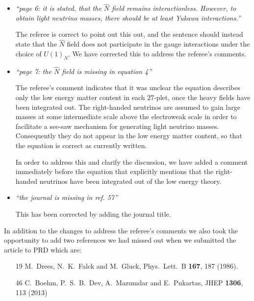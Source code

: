 \documentclass[12pt]{article}
\begin{document}
\begin{itemize}
\item {\it ``page 6: it is stated, that the $\hat N$ field remains
interactionless. However, to obtain light neutrino masses, there should be
at least Yukawa interactions.''}

The referee is correct to point out this out, and the sentence should instead
state that the $\hat N$ field does not participate in the gauge interactions
under the choice of $U(1)_N$. We have corrected this to address the referee's
comments.

\item {\it ``page 7: the $\hat N$ field is missing in equation 4''}

The referee's comment indicates that it was unclear the equation describes
only the low energy matter content in each $27$-plet, once the heavy fields
have been integrated out. The right-handed neutrinos are assumed to gain
large masses at some intermediate scale above the electroweak scale in order
to facilitate a see-saw mechanism for generating light neutrino masses.
Consequently they do not appear in the low energy matter content, so that
the equation is correct as currently written.

In order to address this and clarify the discussion, we have added a comment
immediately before the equation that explicitly mentions that the right-handed
neutrinos have been integrated out of the low energy theory.

\item {\it ``the journal is missing in ref. 57''}

This has been corrected by adding the journal title.


\end{itemize}

In addition to the changes to address the referee's comments we also took the
opportunity to add two references we had missed out when we submitted the
article to PRD which are:
\begin{itemize}
\item [19]  M.~Drees, N.~K.~Falck and M.~Gluck, Phys.\ Lett.\ B {\bf 167},
187 (1986).
\item [46]  C.~Boehm, P.~S.~B.~Dev, A.~Mazumdar and E.~Pukartas, JHEP
{\bf 1306}, 113 (2013)
\end{itemize}
\end{document}
